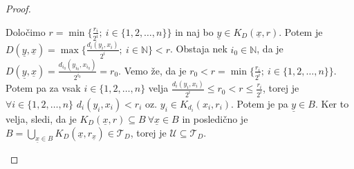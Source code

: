\documentclass[a4paper, 10pt]{article}
\newcommand{\ul}[1]{\underline{\ensuremath{#1}}}
\newcommand{\mth}[1]{\ensuremath{\mathbb{#1}}}
\newcommand{\N}{\mth{N}}
\newcommand{\set}[1]{\ensuremath{\{1, 2, \ldots , #1\}}}
\begin{document}
\begin{proof}
\begin{itemize}
			Določimo $r = \min\{\frac{r_i}{2^i};~ i\in\set{n}\}$ in naj bo $\ul{y}\in K_D(\ul{x}, r)$. Potem je $D(\ul{y}, \ul{x}) = \max\{\frac{d_i(y_i, x_i)}{2^i};~i\in\N\} < r$. Obstaja nek $i_0\in\N$, da je $D(\ul{y}, \ul{x}) = \frac{d_{i_0}(y_{i_0}, x_{i_0})}{2^{i_0}} = r_0$. Vemo že, da je $r_0 < r = \min\{\frac{r_i}{2^i};~i\in\set{n}\}$. Potem pa za vsak $i\in \set{n}$ velja $\frac{d_i(y_i, x_i)}{2^i} \leq r_0 < r \leq \frac{r_i}{2^i}$, torej je $\forall i \in \set{n}$ $d_i(y_i, x_i) < r_i$ oz. $y_i\in K_{d_i}(x_i, r_i)$. Potem je pa $\ul{y}\in B$. Ker to velja, sledi, da je $K_D(\ul{x}, r) \subseteq B ~\forall \ul{x}\in B$ in posledično je $B = \bigcup_{\ul{x}\in B} K_D(\ul{x}, r_{\ul{x}}) \in \mathcal{T}_D$, torej je $\mathcal{U} \subseteq \mathcal{T}_D$.
		\end{itemize}
	\end{proof}
\end{document}
